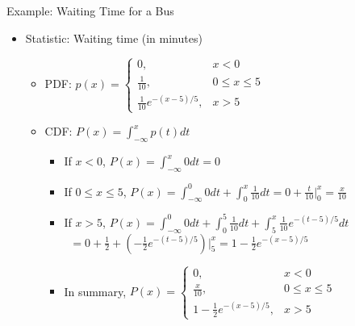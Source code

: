 \documentclass{beamer}
\begin{document}
\begin{frame}{Example: Waiting Time for a Bus}
    \begin{itemize}
        \item Statistic: Waiting time (in minutes)
        
        \begin{itemize}
            \item PDF: $p(x) = \begin{cases}
                0, & x < 0 \\
                \frac{1}{10}, & 0 \leq x \leq 5 \\
                \frac{1}{10}e^{-(x-5)/5}, & x > 5
            \end{cases}$ \pause 

            \vfill 
            
            \item CDF: $P(x) = \int_{-\infty}^x p(t)dt$ \pause 
            \begin{itemize}
                \item If $x < 0$, $P(x) = \int_{-\infty}^x 0dt = 0$ \pause 
                \item If $0 \leq x \leq 5$, $P(x) = \int_{-\infty}^0 0dt + \int_0^x \frac{1}{10}dt = 0 + \frac{t}{10}\Big|_0^{x} = \frac{x}{10}$ \pause 
                \item If $x > 5$, $P(x) = \int_{-\infty}^0 0dt + \int_0^5 \frac{1}{10}dt + \int_5^x \frac{1}{10}e^{-(t-5)/5}dt$ \\ 
                \qquad \quad \ $= 0 + \frac{1}{2} + \left(-\frac{1}{2}e^{-(t-5)/5}\right)\Big|_5^x = 1 - \frac{1}{2}e^{-(x-5)/5}$ \pause
                \item In summary, $P(x) = \begin{cases}
                    0, & x < 0 \\
                    \frac{x}{10}, & 0 \leq x \leq 5 \\
                    1 - \frac{1}{2}e^{-(x-5)/5}, & x > 5
                \end{cases}$
            \end{itemize}
        \end{itemize}
    \end{itemize}
\end{frame}
\end{document}
